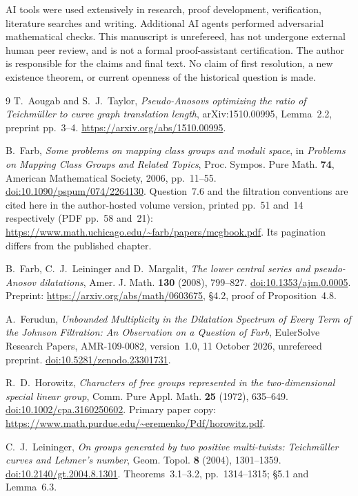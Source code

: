 \documentclass[11pt]{article}
\theoremstyle{remark}\newtheorem*{remark}{Remark}
\begin{document}
AI tools were used extensively in research, proof development,
verification, literature searches and writing. Additional AI agents
performed adversarial mathematical checks. This manuscript is
unrefereed, has not undergone external human peer review, and is not
a formal proof-assistant certification. The author is responsible for
the claims and final text. No claim of first resolution, a new existence
theorem, or current openness of the historical question is made.

\begin{thebibliography}{9}
 T.~Aougab and S.~J.~Taylor,
\emph{Pseudo-Anosovs optimizing the ratio of Teichm\"uller to curve graph
translation length}, arXiv:1510.00995, Lemma~2.2, preprint pp.~3--4.
\url{https://arxiv.org/abs/1510.00995}.

 B.~Farb,
\emph{Some problems on mapping class groups and moduli space},
in \emph{Problems on Mapping Class Groups and Related Topics},
Proc. Sympos. Pure Math. \textbf{74}, American Mathematical Society,
2006, pp.~11--55.
\href{https://doi.org/10.1090/pspum/074/2264130}{doi:10.1090/pspum/074/2264130}.
Question~7.6 and the filtration conventions are cited here in the
author-hosted volume version, printed pp.~51 and~14 respectively
(PDF pp.~58 and~21):
\url{https://www.math.uchicago.edu/~farb/papers/mcgbook.pdf}.
Its pagination differs from the published chapter.

 B.~Farb, C.~J.~Leininger and D.~Margalit,
\emph{The lower central series and pseudo-Anosov dilatations},
Amer. J. Math. \textbf{130} (2008), 799--827.
\href{https://doi.org/10.1353/ajm.0.0005}{doi:10.1353/ajm.0.0005}.
Preprint: \url{https://arxiv.org/abs/math/0603675},
\S4.2, proof of Proposition~4.8.

 A.~Ferudun,
\emph{Unbounded Multiplicity in the Dilatation Spectrum of Every Term
of the Johnson Filtration: An Observation on a Question of Farb},
EulerSolve Research Papers, AMR-109-0082, version~1.0,
11 October 2026, unrefereed preprint.
\href{https://doi.org/10.5281/zenodo.23301731}{doi:10.5281/zenodo.23301731}.

 R.~D.~Horowitz,
\emph{Characters of free groups represented in the two-dimensional
special linear group}, Comm. Pure Appl. Math. \textbf{25} (1972),
635--649.
\href{https://doi.org/10.1002/cpa.3160250602}{doi:10.1002/cpa.3160250602}.
Primary paper copy:
\url{https://www.math.purdue.edu/~eremenko/Pdf/horowitz.pdf}.

 C.~J.~Leininger,
\emph{On groups generated by two positive multi-twists:
Teichm\"uller curves and Lehmer's number},
Geom. Topol. \textbf{8} (2004), 1301--1359.
\href{https://doi.org/10.2140/gt.2004.8.1301}{doi:10.2140/gt.2004.8.1301}.
Theorems~3.1--3.2, pp.~1314--1315; \S5.1 and Lemma~6.3.
\end{thebibliography}
\end{document}
